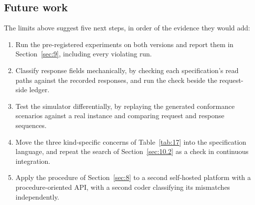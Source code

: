 \subsection{Future work}\label{sec:10.4}

The limits above suggest five next steps, in order of the evidence they would add:

\begin{enumerate}
\def\labelenumi{\arabic{enumi}.}
\item
  Run the pre-registered experiments on both versions and report them in Section~\ref{sec:9}, including every
  violating run.
\item
  Classify response fields mechanically, by checking each specification's read paths against the
  recorded responses, and run the check beside the request-side ledger.
\item
  Test the simulator differentially, by replaying the generated conformance scenarios against a real
  instance and comparing request and response sequences.
\item
  Move the three kind-specific concerns of Table~\ref{tab:17} into the specification language, and repeat the
  search of Section~\ref{sec:10.2} as a check in continuous integration.
\item
  Apply the procedure of Section~\ref{sec:8} to a second self-hosted platform with a procedure-oriented API,
  with a second coder classifying its mismatches independently.
\end{enumerate}
